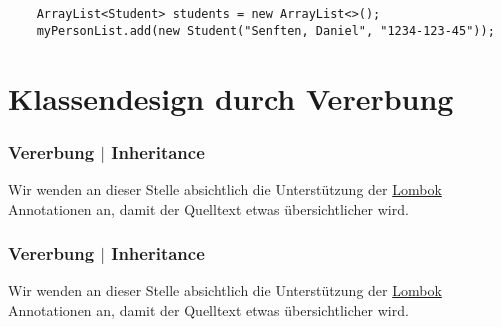 \begin{verbatim}
    ArrayList<Student> students = new ArrayList<>();
    myPersonList.add(new Student("Senften, Daniel", "1234-123-45"));
\end{verbatim}



\section{Klassendesign durch Vererbung}
\label{sec:inheritance}

\begin{frame}[fragile]
    \frametitle<presentation>{Vererbung $|$ Inheritance}
\end{frame}

Wir wenden an dieser Stelle absichtlich die Unterstützung der
\href{https://projectlombok.org/features/all}{Lombok} Annotationen an, damit
der Quelltext etwas übersichtlicher wird.



\begin{frame}[fragile]
    \frametitle<presentation>{Vererbung $|$ Inheritance}
\end{frame}

Wir wenden an dieser Stelle absichtlich die Unterstützung der
\href{https://projectlombok.org/features/all}{Lombok} Annotationen an, damit
der Quelltext etwas übersichtlicher wird.

